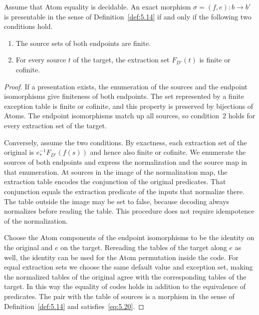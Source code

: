 \begin{theorem}\label{thm:5.15}

Assume that Atom equality is decidable. An exact morphism $\sigma=(f,e):b\to b'$ is
presentable in the sense of Definition~\ref{def:5.14} if and only if the following two
conditions hold.

\begin{enumerate}
\item The source sets of both endpoints are finite.
\item For every source $t$ of the target, the extraction set $F_{D'}(t)$ is finite or
cofinite.
\end{enumerate}

\end{theorem}

\begin{proof}

If a presentation exists, the enumeration of the sources and the endpoint isomorphisms give
finiteness of both endpoints. The set represented by a finite exception table is finite or
cofinite, and this property is preserved by bijections of Atoms. The endpoint isomorphisms
match up all sources, so condition~2 holds for every extraction set of the target.

Conversely, assume the two conditions. By exactness, each extraction set of the original is
$e^{-1}_*F_{D'}(f(s))$ and hence also finite or cofinite. We enumerate the sources of both
endpoints and express the normalization and the source map in that enumeration. At sources
in the image of the normalization map, the extraction table encodes the conjunction of the
original predicates. That conjunction equals the extraction predicate of the inputs that
normalize there. The table outside the image may be set to false, because decoding always
normalizes before reading the table. This procedure does not require idempotence of the
normalization.

Choose the Atom components of the endpoint isomorphisms to be the identity on the original
and $e$ on the target. Rereading the tables of the target along $e$ as well, the identity
can be used for the Atom permutation inside the code. For equal extraction sets we choose
the same default value and exception set, making the normalized tables of the original agree
with the corresponding tables of the target. In this way the equality of codes holds in
addition to the equivalence of predicates. The pair with the table of sources is a morphism
in the sense of Definition~\ref{def:5.14} and satisfies~\eqref{eq:5.20}.

\end{proof}


